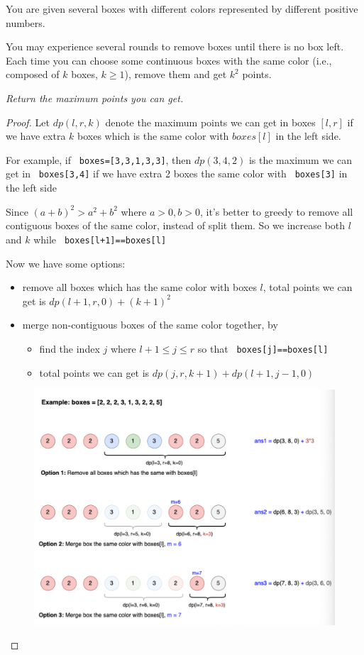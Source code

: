 \documentclass[11pt]{article}
\let\OldTexttt\texttt
\renewcommand{\texttt}[1]{\OldTexttt{\color{MidnightBlue} #1}}
\begin{document}
\begin{problem}
You are given several boxes with different colors represented by different positive numbers.

You may experience several rounds to remove boxes until there is no box left. Each time you can
choose some continuous boxes with the same color (i.e., composed of \(k\) boxes, \(k\ge 1\)), remove
them and get \(k^2\) points.

\emph{Return the maximum points you can get.}
\end{problem}

\begin{proof}
Let \(dp(l,r,k)\) denote the maximum points we can get in boxes \([l,r]\) if we have extra \(k\)
boxes which is the same color with \(boxes[l]\) in the left side.

For example, if \texttt{boxes=[3,3,1,3,3]}, then \(dp(3,4,2)\) is the maximum we can get in \texttt{boxes[3,4]} if
we have extra 2 boxes the same color with \texttt{boxes[3]} in the left side

Since \((a+b)^2>a^2+b^2\) where \(a>0,b>0\), it's better to greedy to remove all contiguous boxes
of the same color, instead of split them. So we increase both \(l\) and \(k\) while
\texttt{boxes[l+1]==boxes[l]}

Now we have some options:
\begin{itemize}
\item remove all boxes which has the same color with boxes \(l\), total points we can get is
\(dp(l+1,r,0)+(k+1)^2\)
\item merge non-contiguous boxes of the same color together, by
\begin{itemize}
\item find the index \(j\) where \(l+1\le j\le r\) so that \texttt{boxes[j]==boxes[l]}
\item total points we can get is \(dp(j,r,k+1)+dp(l+1,j-1,0)\)
\end{itemize}
\end{itemize}

\begin{figure}[htbp]
\centering
\includegraphics[width=.6\textwidth]{../images/cp/1.png}
\label{}
\end{figure}
\end{proof}
\end{document}
